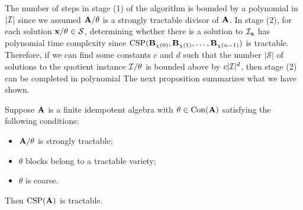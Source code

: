 {The number of steps in stage (1) of the algorithm is bounded by a polynomial in $|\mathcal{I}|$
since we assumed $\mathbf{A}/\theta$ is a strongly tractable divisor of $\mathbf{A}$.
In stage (2), for each solution $\mathbf{x}/\theta \in \mathcal S$,
determining whether there is a solution to $\mathcal{I}_{\mathbf{x}}$ has polynomial time complexity since
$\operatorname{CSP}(\mathbf{B}_{\chi(0)}, \mathbf{B}_{\chi(1)}, \dots, \mathbf{B}_{\chi(n-1)})$ is tractable.  Therefore,
if we can find some constants $c$ and $d$ such that the number $|\mathcal S|$ of solutions to the quotient instance
$\mathcal{I}/\theta$ is bounded above by $c|\mathcal{I}|^{d}$, then stage (2) can be completed in
polynomial 
The next proposition summarizes what we have shown.
\begin{proposition}
  \label{prop:chain-atop-tractable}
  Suppose $\mathbf{A}$ is a finite idempotent algebra with $\theta \in \operatorname{Con}(\mathbf{A})$ satisfying the following conditions:
  \begin{itemize}
  \item  $\mathbf{A}/\theta$ is strongly tractable;
  \item  $\theta$ blocks belong to a tractable variety;
  \item  $\theta$ is coarse.
  \end{itemize}
  Then $\operatorname{CSP}(\mathbf{A})$ is tractable.
\end{proposition}
}{}



















